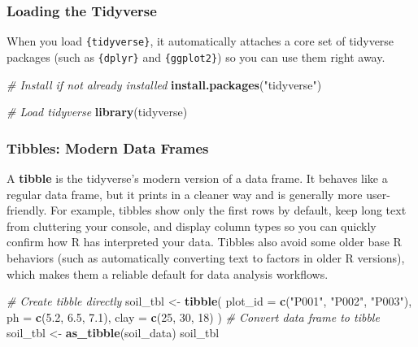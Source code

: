 \documentclass[
  10pt,
  b5paper,
  oneside]{book}
\newenvironment{Shaded}{\begin{snugshade}}{\end{snugshade}}
\newcommand{\AttributeTok}[1]{\textcolor[rgb]{0.13,0.29,0.53}{#1}}
\newcommand{\CommentTok}[1]{\textcolor[rgb]{0.56,0.35,0.01}{\textit{#1}}}
\newcommand{\DecValTok}[1]{\textcolor[rgb]{0.00,0.00,0.81}{#1}}
\newcommand{\FloatTok}[1]{\textcolor[rgb]{0.00,0.00,0.81}{#1}}
\newcommand{\FunctionTok}[1]{\textcolor[rgb]{0.13,0.29,0.53}{\textbf{#1}}}
\newcommand{\NormalTok}[1]{#1}
\newcommand{\OtherTok}[1]{\textcolor[rgb]{0.56,0.35,0.01}{#1}}
\newcommand{\StringTok}[1]{\textcolor[rgb]{0.31,0.60,0.02}{#1}}
\begin{document}
\subsubsection{Loading the Tidyverse}\label{tidyverse-load}

When you load \texttt{\{tidyverse\}}, it automatically attaches a core set of tidyverse packages (such as \texttt{\{dplyr\}} and \texttt{\{ggplot2\}}) so you can use them right away.

\begin{Shaded}
\begin{Highlighting}[]
\CommentTok{\# Install if not already installed}
\FunctionTok{install.packages}\NormalTok{(}\StringTok{"tidyverse"}\NormalTok{)}

\CommentTok{\# Load tidyverse}
\FunctionTok{library}\NormalTok{(tidyverse)}
\end{Highlighting}
\end{Shaded}

\subsubsection{Tibbles: Modern Data Frames}\label{tidyverse-tibbles}

A \textbf{tibble} is the tidyverse's modern version of a data frame. It behaves like a regular data frame, but it prints in a cleaner way and is generally more user-friendly. For example, tibbles show only the first rows by default, keep long text from cluttering your console, and display column types so you can quickly confirm how R has interpreted your data. Tibbles also avoid some older base R behaviors (such as automatically converting text to factors in older R versions), which makes them a reliable default for data analysis workflows.

\begin{Shaded}
\begin{Highlighting}[]
\CommentTok{\# Create tibble directly}
\NormalTok{soil\_tbl }\OtherTok{\textless{}{-}} \FunctionTok{tibble}\NormalTok{(}
  \AttributeTok{plot\_id =} \FunctionTok{c}\NormalTok{(}\StringTok{"P001"}\NormalTok{, }\StringTok{"P002"}\NormalTok{, }\StringTok{"P003"}\NormalTok{),}
  \AttributeTok{ph =} \FunctionTok{c}\NormalTok{(}\FloatTok{5.2}\NormalTok{, }\FloatTok{6.5}\NormalTok{, }\FloatTok{7.1}\NormalTok{),}
  \AttributeTok{clay =} \FunctionTok{c}\NormalTok{(}\DecValTok{25}\NormalTok{, }\DecValTok{30}\NormalTok{, }\DecValTok{18}\NormalTok{)}
\NormalTok{)}
\CommentTok{\# Convert data frame to tibble}
\NormalTok{soil\_tbl }\OtherTok{\textless{}{-}} \FunctionTok{as\_tibble}\NormalTok{(soil\_data)}
\NormalTok{soil\_tbl}
\end{Highlighting}
\end{Shaded}
\end{document}
